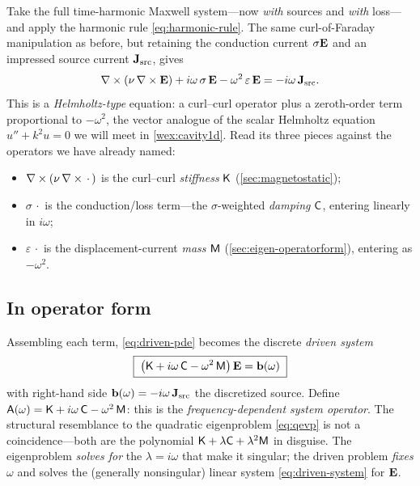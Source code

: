 Take the full time-harmonic Maxwell system---now \emph{with} sources and
\emph{with} loss---and apply the harmonic rule \cref{eq:harmonic-rule}. The same
curl-of-Faraday manipulation as before, but retaining the conduction current
$\sigma\mathbf{E}$ and an impressed source current $\mathbf{J}_{\text{src}}$, gives
\begin{equation}
  \nabla\times(\nu\,\nabla\times\mathbf{E})
    + i\omega\,\sigma\,\mathbf{E}
    - \omega^2\,\varepsilon\,\mathbf{E}
    = -i\omega\,\mathbf{J}_{\text{src}}.
  \label{eq:driven-pde}
\end{equation}
This is a \emph{Helmholtz-type} equation: a curl--curl operator plus a
zeroth-order term proportional to $-\omega^2$, the vector analogue of the scalar
Helmholtz equation $u'' + k^2 u = 0$ we will meet in
\cref{wex:cavity1d}. Read its three pieces against the operators we have already
named:
\begin{itemize}[nosep]
  \item $\nabla\times(\nu\,\nabla\times\,\cdot\,)$ is the curl--curl \emph{stiffness} $\mathsf{K}$
  (\cref{sec:magnetostatic});
  \item $\sigma\,\cdot$ is the conduction/loss term---the $\sigma$-weighted
  \emph{damping} $\mathsf{C}$, entering linearly in $i\omega$;
  \item $\varepsilon\,\cdot$ is the displacement-current \emph{mass} $\mathsf{M}$
  (\cref{sec:eigen-operatorform}), entering as $-\omega^2$.
\end{itemize}

\subsection{In operator form}

Assembling each term, \cref{eq:driven-pde} becomes the discrete \emph{driven
system}
\begin{equation}
  \boxed{\;\bigl(\mathsf{K} + i\omega\,\mathsf{C} - \omega^2\,\mathsf{M}\bigr)\,\mathbf{E} = \mathbf{b}(\omega)\;}
  \label{eq:driven-system}
\end{equation}
with right-hand side $\mathbf{b}(\omega)=-i\omega\,\mathbf{J}_{\text{src}}$ the discretized
source. Define $\mathsf{A}(\omega) = \mathsf{K} + i\omega\,\mathsf{C} - \omega^2\,\mathsf{M}$: this is the
\emph{frequency-dependent system operator}. The structural resemblance to the
quadratic eigenproblem \cref{eq:qevp} is not a coincidence---both are the
polynomial $\mathsf{K} + \lambda\mathsf{C} + \lambda^2\mathsf{M}$ in disguise. The eigenproblem
\emph{solves for} the $\lambda=i\omega$ that make it singular; the driven problem
\emph{fixes} $\omega$ and solves the (generally nonsingular) linear system
\cref{eq:driven-system} for $\mathbf{E}$.

